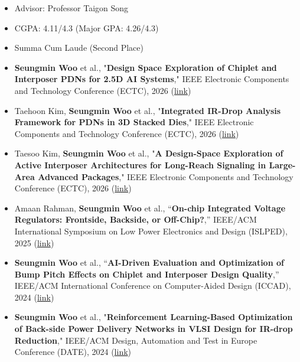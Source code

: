 \documentclass[10pt,letter,ragged2e]{altacv}
\begin{document}

\begin{itemize}
    \item Advisor: Professor Taigon Song
    \item CGPA: 4.11/4.3 (Major GPA: 4.26/4.3)
    \item Summa Cum Laude (Second Place)
\end{itemize}






\begin{itemize}
    \item \textbf{Seungmin Woo} et al., "\textbf{Design Space Exploration of Chiplet and Interposer PDNs for 2.5D AI Systems}," IEEE Electronic Components and Technology Conference (ECTC), 2026 (\href{https://ieeexplore.ieee.org/abstract/document/11561248}{link})
    \item Taehoon Kim, \textbf{Seungmin Woo} et al., "\textbf{Integrated IR-Drop Analysis Framework for PDNs in 3D Stacked Dies}," IEEE Electronic Components and Technology Conference (ECTC), 2026 (\href{https://ieeexplore.ieee.org/abstract/document/11561267}{link})
    \item Taesoo Kim, \textbf{Seungmin Woo} et al., "\textbf{A Design-Space Exploration of Active Interposer Architectures for Long-Reach Signaling in Large-Area Advanced Packages}," IEEE Electronic Components and Technology Conference (ECTC), 2026 (\href{https://ieeexplore.ieee.org/abstract/document/11561129}{link})
    \item Amaan Rahman, \textbf{Seungmin Woo} et al., “\textbf{On-chip Integrated Voltage Regulators: Frontside, Backside, or Off-Chip?},” IEEE/ACM International Symposium on Low Power Electronics and Design (ISLPED), 2025 (\href{https://doi.org/10.1109/ISLPED65674.2025.11261800}{link})
    \item \textbf{Seungmin Woo} et al., “\textbf{AI-Driven Evaluation and Optimization of Bump Pitch Effects on Chiplet and Interposer Design Quality},” IEEE/ACM International Conference on Computer-Aided Design (ICCAD), 2024 (\href{https://doi.org/10.1145/3676536.3676817}{link})
    \item \textbf{Seungmin Woo} et al., "\textbf{Reinforcement Learning-Based Optimization of Back-side Power Delivery Networks in VLSI Design for IR-drop Reduction}," IEEE/ACM Design, Automation and Test in Europe Conference (DATE), 2024 (\href{https://doi.org/10.23919/DATE58400.2024.10546599}{link})
\end{itemize}
\end{document}

